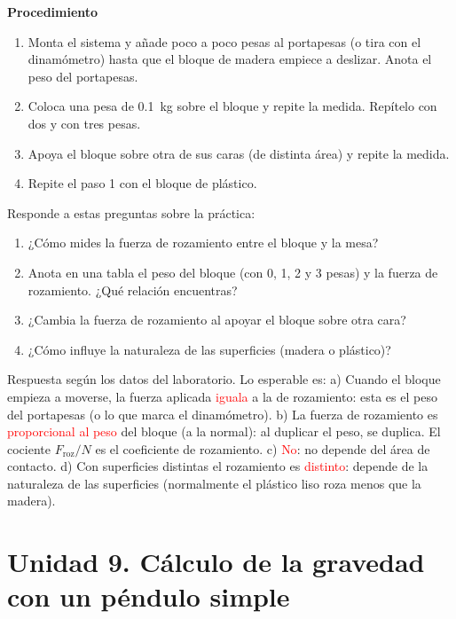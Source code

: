 \textbf{Procedimiento}
\begin{enumerate}[label=\numberballgreen]
    \item Monta el sistema y añade poco a poco pesas al portapesas (o tira con el dinamómetro) hasta que el bloque de madera empiece a deslizar. Anota el peso del portapesas.
    \item Coloca una pesa de \qty{0.1}{\kg} sobre el bloque y repite la medida. Repítelo con dos y con tres pesas.
    \item Apoya el bloque sobre otra de sus caras (de distinta área) y repite la medida.
    \item Repite el paso 1 con el bloque de plástico.
\end{enumerate}

\begin{exercise}
    Responde a estas preguntas sobre la práctica:
    \begin{enumerate}[label=\alph*)]
        \item ¿Cómo mides la fuerza de rozamiento entre el bloque y la mesa?
        \item Anota en una tabla el peso del bloque (con 0, 1, 2 y 3 pesas) y la fuerza de rozamiento. ¿Qué relación encuentras?
        \item ¿Cambia la fuerza de rozamiento al apoyar el bloque sobre otra cara?
        \item ¿Cómo influye la naturaleza de las superficies (madera o plástico)?
    \end{enumerate}
    \begin{solu}
        Respuesta según los datos del laboratorio. Lo esperable es:
        a) Cuando el bloque empieza a moverse, la fuerza aplicada \textcolor{red}{iguala} a la de rozamiento: esta es el peso del portapesas (o lo que marca el dinamómetro).
        b) La fuerza de rozamiento es \textcolor{red}{proporcional al peso} del bloque (a la normal): al duplicar el peso, se duplica. El cociente \(F_\text{roz}/N\) es el coeficiente de rozamiento.
        c) \textcolor{red}{No}: no depende del área de contacto.
        d) Con superficies distintas el rozamiento es \textcolor{red}{distinto}: depende de la naturaleza de las superficies (normalmente el plástico liso roza menos que la madera).
    \end{solu}
\end{exercise}

\section[Unidad 9. La gravedad con un péndulo]{Unidad 9. Cálculo de la gravedad con un péndulo simple}

